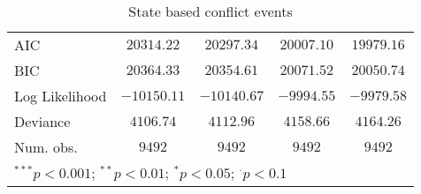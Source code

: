 \begin{sidewaystable}
\begin{center}
{\begin{tabular}{l c c c c}
\midrule
AIC                                      & $20314.22$    & $20297.34$    & $20007.10$    & $19979.16$      \\
BIC                                      & $20364.33$    & $20354.61$    & $20071.52$    & $20050.74$      \\
Log Likelihood                           & $-10150.11$   & $-10140.67$   & $-9994.55$    & $-9979.58$      \\
Deviance                                 & $4106.74$     & $4112.96$     & $4158.66$     & $4164.26$       \\
Num. obs.                                & $9492$        & $9492$        & $9492$        & $9492$          \\
\bottomrule
\multicolumn{5}{l}{\scriptsize{$^{***}p<0.001$; $^{**}p<0.01$; $^{*}p<0.05$; $^{\cdot}p<0.1$}}
\end{tabular}
}
\caption{State based conflict events}
\label{state_based}
\end{center}
\end{sidewaystable}
